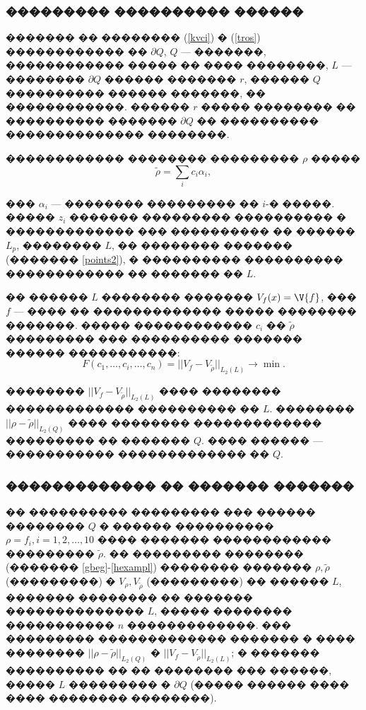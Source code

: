 \documentclass[a4paper]{article}
\begin{document}
\subsubsection{��������� ���������� ������}
������� �� �������� (\ref{kvci}) � (\ref{tros}) ������������ �� $\partial Q$, $Q$ --- �������, ������������ ����� �� ���� ��������,
$L$ --- �������� $\partial Q$ ������ ������� $r$, ������ $Q$ ���������� ������ �������, �� ������������. ������ $r$ ����� �������� �� ���������� ������� $\partial Q$ �� ���������� �������������� ��������.

������������ �������� ��������� $\rho$ �����
\begin{equation*}
  \tilde{\rho} = \sum_i c_i \alpha_i,
\end{equation*}

��� $\alpha_i$ --- �������� ��������� �� $i$-� �����.
����� $z_i$ ������� ��������� ���������� � ������������� ��� ���������� �� ������ $L_p$, �������� $L$, �� �������� ������� (������� \ref{points2}), � ���������� ���������� ������������ �� ������� �� $L$.

�� ������ $L$ �������� ������� $V_f(x)=\V{f}$, ��� $f$ --- ���� �� ������������� ����� �������� �������.
����� ������������ $c_i$ �� $\tilde{\rho}$ ��������� ��� ���������� ������� ������ �����������:
\begin{equation*}
  F(c_1,\dots,c_i,\dots,c_n)=||V_f-V_{\tilde{\rho} } ||_{L_2(L)}\rightarrow \min.
\end{equation*}

�������� $||V_f-V_{\tilde{\rho} } ||_{L_2(L)}$ ���� �������� ������������� ���������� �� $L$.
�������� $||\rho-\tilde{\rho} ||_{L_2(Q)}$ ���� �������� ������������� ��������� �� ������� $Q$.
���� ������ --- ����������� ������������� �� $Q$.

\subsubsection{������������� �� ������� �������}
�� ���������� ��������� ��� ������ �������� $Q$ � ������ ���������� $\rho=f_i,i=1,2,\dots,10$ ���� ������� ������������ ��������� $\tilde{\rho}$.
�� ��������� �������� (������� \ref{gbeg}-\ref{hexampl}) �������� ������� $\rho, \tilde{\rho}$ (���������) � $V_{\rho},V_{\tilde{\rho}}$ (���������) �� ������ $L$, ������� �������� �� ������� �������������� $L$, ����� �������� ����������� $n$ �������������.
��� ��������� ������������� ������� � ���� �������� $||\rho-\tilde{\rho} ||_{L_2(Q)}$ � $||V_f-V_{\tilde{\rho} } ||_{L_2(L)}$; � ������� ���������� �� �� �������� ��� ������, ����� $L$ ��������� � $\partial Q$ (����� ������ ���� ���� �������� ��������).
\end{document}
